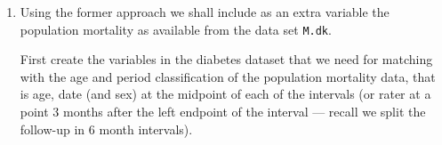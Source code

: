 \begin{enumerate}[resume]




\item Using the former approach we shall include as an extra variable
  the population mortality as available from the data set
  \texttt{M.dk}.

  First create the variables in the diabetes dataset that we need for
  matching with the age and period classification of the population
  mortality data, that is age, date (and sex) at the midpoint of each of
  the intervals (or rater at a point 3 months after the left endpoint
  of the interval --- recall we split the follow-up in 6 month
  intervals).


\end{enumerate}
